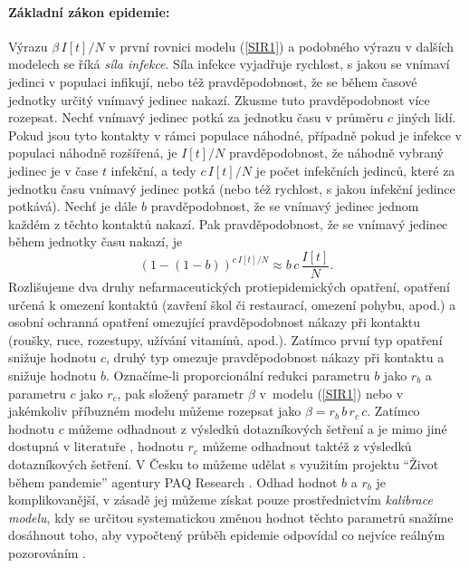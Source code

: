 \paragraph{Základní zákon epidemie:} Výrazu $\beta\,I[t]/N$ v první rovnici modelu (\ref{SIR1}) a podobného výrazu v dalších modelech se říká \emph{síla infekce}. Síla infekce vyjadřuje rychlost, s jakou se vnímaví jedinci v populaci infikují, nebo též pravděpodobnost, že se během časové jednotky určitý vnímavý jedinec nakazí. Zkusme tuto pravděpodobnost více rozepsat. Nechť vnímavý jedinec potká za jednotku času v průměru $c$ jiných lidí. Pokud jsou tyto kontakty v rámci populace náhodné, případně pokud je infekce v populaci náhodně rozšířená, je $I[t]/N$ pravděpodobnost, že náhodně vybraný jedinec je v čase $t$ infekční, a tedy $c\,I[t]/N$ je počet infekčních jedinců, které za jednotku času vnímavý jedinec potká (nebo též rychlost, s jakou infekční jedince potkává). Nechť je dále $b$ pravděpodobnost, že se vnímavý jedinec jednom každém z těchto kontaktů nakazí. Pak pravděpodobnost, že se vnímavý jedinec během jednotky času nakazí, je 
\begin{equation}
(1-(1-b))^{c\,I[t]/N} \approx b\, c \, \frac{I[t]}{N}.
\end{equation}
Rozlišujeme dva druhy nefarmaceutických protiepidemických opatření, opatření určená k omezení kontaktů (zavření škol či restaurací, omezení pohybu, apod.) a osobní ochranná opatření omezující pravděpodobnost nákazy při kontaktu (roušky, ruce, rozestupy, užívání vitamínů, apod.). Zatímco první typ opatření snižuje hodnotu $c$, druhý typ omezuje pravděpodobnost nákazy při kontaktu a snižuje hodnotu $b$. Označíme-li proporcionální redukci parametru $b$ jako $r_b$ a parametru $c$ jako $r_c$, pak složený parametr $\beta$ v~modelu (\ref{SIR1}) nebo v jakémkoliv příbuzném modelu můžeme rozepsat jako $\beta = r_b\,b\,r_c\,c$. Zatímco hodnotu $c$ můžeme odhadnout z výsledků dotazníkových šetření a je mimo jiné dostupná v literatuře \cite{Prem_etal2017}, hodnotu $r_c$ můžeme odhadnout taktéž z výsledků dotazníkových šetření. V Česku to můžeme udělat s využitím projektu ``Život během pandemie'' agentury PAQ Research \cite[\url{www.zivotbehempandemie.cz}]{paqcovid}. Odhad hodnot $b$ a $r_b$ je komplikovanější, v zásadě jej můžeme získat pouze prostřednictvím \emph{kalibrace modelu}, kdy se určitou systematickou změnou hodnot těchto parametrů snažíme dosáhnout toho, aby vypočtený průběh epidemie odpovídal co nejvíce reálným pozorováním \cite{Yang_etal2014,King_etal2016}. 

